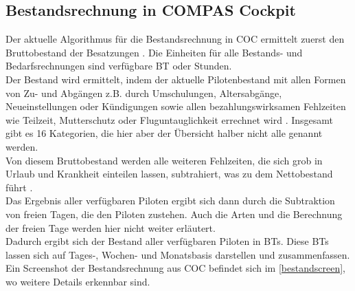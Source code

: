 \documentclass [12pt, a4paper, oneside, titlepage, ngerman]{article}
\begin{document}
\subsection{Bestandsrechnung in COMPAS Cockpit} \label{bestandsrechnung}
Der aktuelle Algorithmus für die Bestandsrechnung in \ac{COC} ermittelt zuerst den Bruttobestand der Besatzungen \cite[vgl.][S.8]{capfunc}. Die Einheiten für alle Bestands- und Bedarfsrechnungen sind verfügbare \ac{BT} oder Stunden. \\
Der Bestand wird ermittelt, indem der aktuelle Pilotenbestand mit allen Formen von Zu- und Abgängen z.B. durch Umschulungen, Altersabgänge, Neueinstellungen oder Kündigungen sowie allen bezahlungswirksamen Fehlzeiten wie Teilzeit, Mutterschutz oder Fluguntauglichkeit errechnet wird \cite[vgl.][S.19]{benutzerhandbuch}. Insgesamt gibt es 16 Kategorien, die hier aber der Übersicht halber nicht alle genannt werden. \\
Von diesem Bruttobestand werden alle weiteren Fehlzeiten, die sich grob in Urlaub und Krankheit einteilen lassen, subtrahiert, was zu dem Nettobestand führt \cite[vgl.][S.8]{capfunc}. \\
Das Ergebnis aller verfügbaren Piloten ergibt sich dann durch die Subtraktion von freien Tagen, die den Piloten zustehen. Auch die Arten und die Berechnung der freien Tage werden hier nicht weiter erläutert. \\
Dadurch ergibt sich der Bestand aller verfügbaren Piloten in \acp{BT}. Diese \acp{BT} lassen sich auf Tages-, Wochen- und Monatsbasis darstellen und zusammenfassen. Ein Screenshot der Bestandsrechnung aus \ac{COC} befindet sich im \autoref{bestandscreen}, wo weitere Details erkennbar sind.
\end{document}
